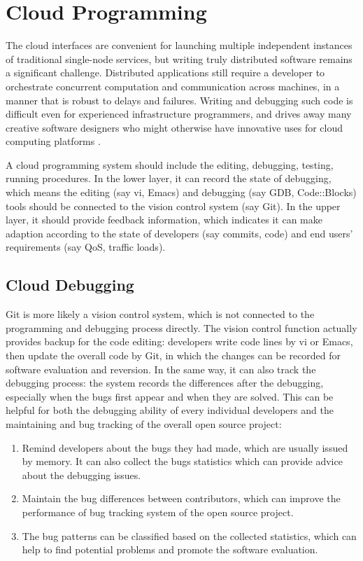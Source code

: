 \documentclass[draftclsnofoot,journal,onecolumn,12pt]{IEEEtran}
\begin{document}
\section{Cloud Programming}

The cloud interfaces are convenient for launching multiple independent instances of traditional single-node services, but writing truly distributed software remains a significant challenge. Distributed applications still require a developer to orchestrate concurrent computation and communication across machines, in a manner that is robust to delays and failures. Writing and debugging such code is difficult even for experienced infrastructure programmers, and drives away many creative software designers who might otherwise have innovative uses for cloud computing platforms \cite{Alvaro:2010:BAE:1755913.1755937}.

A cloud programming system should include the editing, debugging, testing, running procedures. In the lower layer, it can record the state of debugging, which means the editing (say vi, Emacs) and debugging (say GDB, Code::Blocks) tools should be connected to the vision control system (say Git). In the upper layer, it should provide feedback information, which indicates it can make adaption according to the state of developers (say commits, code) and end users' requirements (say QoS, traffic loads).

\subsection{Cloud Debugging}
Git is more likely a vision control system, which is not connected to the programming and debugging process directly. The vision control function actually provides backup for the code editing: developers write code lines by vi or Emacs, then update the overall code by Git, in which the changes can be recorded for software evaluation and reversion. In the same way, it can also track the debugging process: the system records the differences after the debugging, especially when the bugs first appear and when they are solved. This can be helpful for both the debugging ability of every individual developers and the maintaining and bug tracking of the overall open source project:

\begin{enumerate}
  \item Remind developers about the bugs they had made, which are usually issued by memory. It can also collect the bugs statistics which can provide advice about the debugging issues.
  \item Maintain the bug differences between contributors, which can improve the performance of bug tracking system of the open source project.
  \item The bug patterns can be classified based on the collected statistics, which can help to find potential problems and promote the software evaluation.
\end{enumerate}
\end{document}
